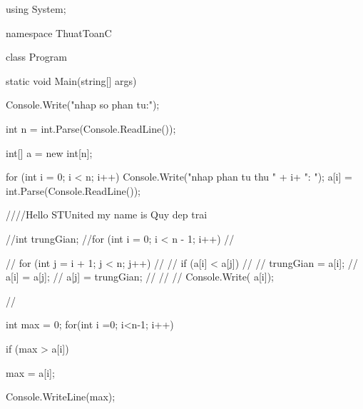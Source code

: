 using System;

namespace ThuatToanC
{
    class Program
    {
        static void Main(string[] args)
        {
            Console.Write("nhap so phan tu:");

            int n = int.Parse(Console.ReadLine());

            int[] a = new int[n];


            for (int i = 0; i < n; i++)
            {
                Console.Write("nhap phan tu thu " + i+ ": ");
                a[i] = int.Parse(Console.ReadLine());
            }

             ////Hello STUnited my name is Quy dep trai

            //int trungGian;
            //for (int i = 0; i < n - 1; i++)
            //{
            //    for (int j = i + 1; j < n; j++)
            //    {
            //        if (a[i] < a[j])
            //        {
            //            trungGian = a[i];
            //            a[i] = a[j];
            //            a[j] = trungGian;
            //        }
            //    }
            //    Console.Write( a[i]);

            //}

             int max = 0;
            for(int i =0; i<n-1; i++)
            {
               
                if (max > a[i])
                {
                    max = a[i];
                    
                }
                Console.WriteLine(max);
            }

        }
    }
}
